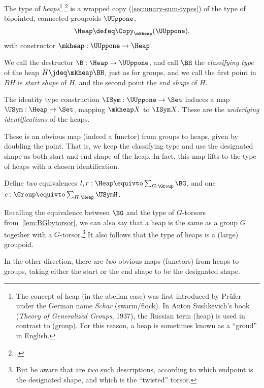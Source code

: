 \begin{definition}\label{def:heap}
  The type of \emph{heaps}\footnote{%
    The concept of heap (in the abelian case)
    was first introduced by Prüfer\footnotemark{}
    under the German name \emph{Schar} (swarm/flock).
    In Anton Sushkevich's book
    (\emph{Theory of Generalized Groups}, 1937),
    the Russian term  (heap)
    is used in contrast to  (group).
    For this reason, a heap is sometimes
    known as a ``groud'' in English.}%
  \footcitetext{Pruefer-AG}
  is a wrapped copy (\cf \cref{sec:unary-sum-types})
  of the type of bipointed, connected groupoids $\UUppone$,
  \[
    \Heap \defeq \Copy_{\mkheap}(\UUppone),
  \]
  with constructor $\mkheap : \UUppone \to \Heap$.
\end{definition}
We call the destructor $\B : \Heap \to \UUppone$,
and call $\BH$ the \emph{classifying type} of the heap $H \jdeq\mkheap\BH$,
just as for groups,
and we call the first point in $BH$ is \emph{start shape} of $H$,
and the second point the \emph{end shape} of $H$.

The identity type construction $\ISym : \UUppone \to \Set$
induces a map $\USym : \Heap \to \Set$,
mapping $\mkheap X$ to $\ISym X$.
These are the \emph{underlying identifications} of the heaps.

These is an obvious map (indeed a functor) from groups to heaps,
given by doubling the point.
That is, we keep the classifying type and use the designated shape
as both start and end shape of the heap.
In fact, this map lifts to the type of heaps with a chosen identification.
\begin{exercise}\label{xca:group+torsor-heap}
  Define \emph{two} equivalences $l,r:\Heap \equivto \sum_{G:\Group}\BG$,
  and one $c:\Group \equivto \sum_{H:\Heap}\USymH$.
\end{exercise}
Recalling the equivalence between $\BG$ and the type of $G$-torsors
from~\cref{lem:BGbytorsor},
we can also say that a heap is the same
as a group $G$ together with a $G$-torsor.\footnote{%
  But be aware that are \emph{two} such descriptions,
  according to which endpoint is the designated shape,
  and which is the ``twisted'' torsor.}
It also follows that the type of heaps is a (large) groupoid.

In the other direction,
there are \emph{two} obvious maps (functors) from heaps to groups,
taking either the start or the end shape to be the designated shape.


